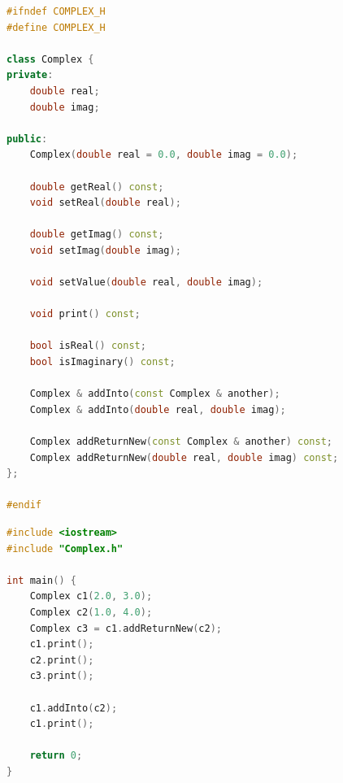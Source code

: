 \documentclass{article}
\begin{document}
\begin{lstlisting}[language=C++, caption=Complex.h]
#ifndef COMPLEX_H
#define COMPLEX_H

class Complex {
private:
    double real;
    double imag;

public:
    Complex(double real = 0.0, double imag = 0.0);

    double getReal() const;
    void setReal(double real);

    double getImag() const;
    void setImag(double imag);

    void setValue(double real, double imag);

    void print() const;

    bool isReal() const;
    bool isImaginary() const;

    Complex & addInto(const Complex & another);
    Complex & addInto(double real, double imag);

    Complex addReturnNew(const Complex & another) const;
    Complex addReturnNew(double real, double imag) const;
};

#endif
\end{lstlisting}

\begin{lstlisting}[language=C++, caption=Main.cpp]
#include <iostream>
#include "Complex.h"

int main() {
    Complex c1(2.0, 3.0);
    Complex c2(1.0, 4.0);
    Complex c3 = c1.addReturnNew(c2);
    c1.print();
    c2.print();
    c3.print();

    c1.addInto(c2);
    c1.print();

    return 0;
}
\end{lstlisting}
\end{document}
